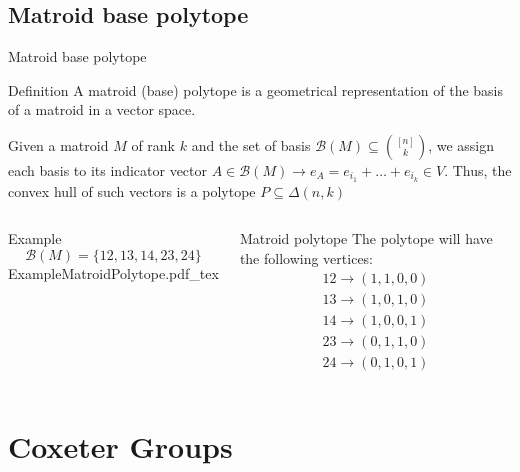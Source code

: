 \documentclass{beamer}
\newcommand{\incfig}[1]{%
\center
\def\svgwidth{0.9\columnwidth}
{#1.pdf_tex}
}
\begin{document}
\subsection{Matroid base polytope}
\begin{frame}{Matroid base polytope}
\begin{block}{Definition}
A matroid (base) polytope is a geometrical representation of the basis of a matroid in a vector space. 

Given a matroid $M$ of rank $k$ and the set of basis $\mathcal{B}(M)\subseteq \binom{[n]}{k}$, we assign each basis to its indicator vector $A\in \mathcal{B}(M) \to e_A = e_{i_1} + \ldots + e_{i_k}\in V$. Thus, the convex hull of such vectors is a polytope $P\subseteq \Delta(n,k)$ 
\end{block}  
\begin{columns}[c]
\begin{block}{Example}
  \[
  \mathcal{B}(M) = \{12, 13, 14, 23, 24\}
  \] 
\incfig{ExampleMatroidPolytope}
\end{block}
\begin{block}{Matroid polytope}
  The polytope will have the following vertices:
  \begin{align*}
    12 \to (1, 1, 0, 0)\\
	13 \to (1, 0, 1, 0)\\
	14 \to (1, 0, 0, 1)\\
	23 \to (0, 1, 1, 0)\\
	24 \to  (0, 1, 0, 1)
  \end{align*}
\end{block}
\end{columns}

\end{frame}


\section{Coxeter Groups}
\end{document}
